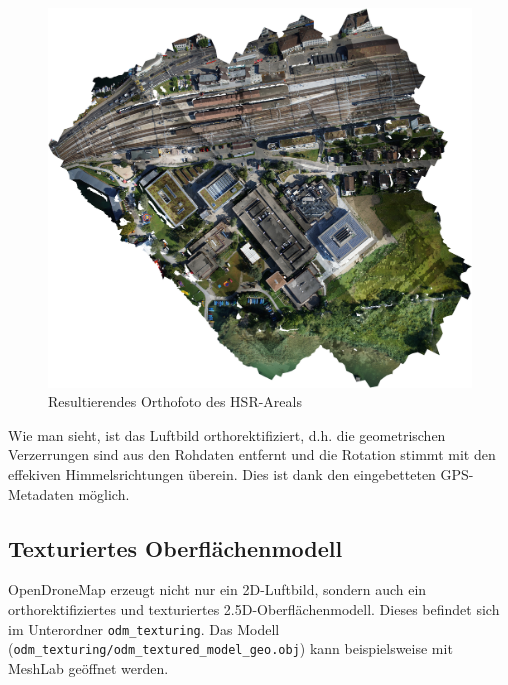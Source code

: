 \begin{figure}[H]
	\centering
	\includegraphics[width=\textwidth]{images/odm_orthophoto}
	\caption{Resultierendes Orthofoto des HSR-Areals}
	\label{img:odm_orthophoto}
\end{figure}

\noindent Wie man sieht, ist das Luftbild orthorektifiziert, d.h. die
geometrischen Verzerrungen sind aus den Rohdaten entfernt und die Rotation
stimmt mit den effekiven Himmelsrichtungen überein. Dies ist dank den
eingebetteten GPS-Metadaten möglich.

\subsection{Texturiertes Oberflächenmodell}

OpenDroneMap erzeugt nicht nur ein 2D-Luftbild, sondern auch ein
orthorektifiziertes und texturiertes 2.5D-Oberflächenmodell. Dieses befindet
sich im Unterordner \texttt{odm\_texturing}. Das Modell
(\texttt{odm\_tex\-tu\-ring/\-odm\_textured\_model\_geo.obj}) kann
beispielsweise mit MeshLab geöffnet werden.

